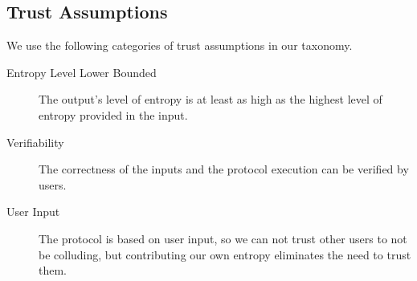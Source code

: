\subsection{Trust Assumptions}
\label{sub:trust_assumptions}
We use the following categories of trust assumptions in our taxonomy. 
\begin{description}
    \item [Entropy Level Lower Bounded] The output's level of entropy is at least as high as the highest level of entropy provided in the input.
    \item [Verifiability] The correctness of the inputs and the protocol execution can be verified by users. 
    \item [User Input] The protocol is based on user input, so we can not trust other users to not be colluding, but contributing our own entropy eliminates the need to trust them.
\end{description}

